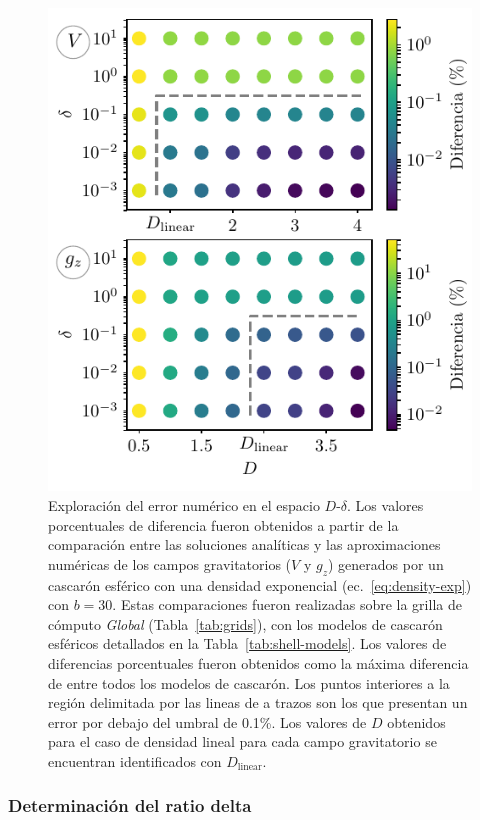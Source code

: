\begin{figure}
\centering
\includegraphics[width=0.5\linewidth]{figs/tesseroids-variable-density/grid-search.pdf}
\caption{
    Exploración del error numérico en el espacio $D$-$\delta$.
    Los valores porcentuales de diferencia fueron obtenidos a partir de la
    comparación entre las soluciones analíticas y las aproximaciones numéricas
    de los campos gravitatorios ($V$ y $g_z$) generados por un cascarón
    esférico con una densidad exponencial
    (ec.~\ref{eq:density-exp}) con $b=30$.
    Estas comparaciones fueron realizadas sobre la grilla de cómputo
    \emph{Global} (Tabla~\ref{tab:grids}), con los modelos de cascarón
    esféricos detallados en la Tabla~\ref{tab:shell-models}.
    Los valores de diferencias porcentuales fueron obtenidos como la máxima
    diferencia de entre todos los modelos de cascarón.
    Los puntos interiores a la región delimitada por las lineas de a trazos son
    los que presentan un error por debajo del umbral de 0.1\%.
    Los valores de $D$ obtenidos para el caso de densidad lineal para cada
    campo gravitatorio se encuentran identificados con $D_\text{linear}$.
    }
\label{fig:grid-search}
\end{figure}


\subsubsection{Determinación del ratio delta}

